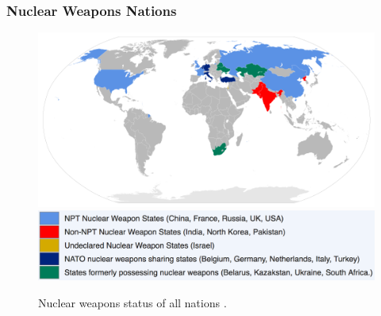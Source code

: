 \begin{frame}
  \frametitle{Nuclear Weapons Nations}
  \begin{figure}[htbp!]
    \begin{center}
      \includegraphics[width=\textwidth]{./images/nuclear-weapons-map.png}\\

\vspace{-10mm}
      \includegraphics[height=0.2\textheight]{./images/nuclear-weapons-legend.png}
    \end{center}
          \caption{Nuclear weapons status of all nations 
          \cite{paleogene_file:nuclear_2017}.}
    \label{fig:nuc-nations-map}
  \end{figure}
\end{frame}




